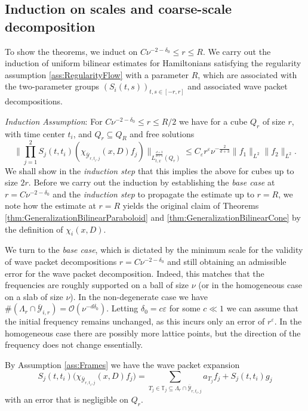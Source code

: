 \documentclass{amsart}
\theoremstyle{definition}
\newcommand{\T}{\mathbb{T}}
\begin{document}
\subsection{Induction on scales and coarse-scale decomposition}
\label{subsection:Induction}
To show the theorems, we induct on $C \nu^{-2-\delta_0} \leq r \leq R$. We carry out the induction of uniform bilinear estimates for Hamiltonians satisfying the regularity assumption \ref{ass:RegularityFlow} with a parameter $R$, which are associated with the two-parameter groups $(S_i(t,s))_{t,s \in [-r,r]}$ and associated wave packet decompositions. 

\emph{Induction Assumption}: For $C \nu^{-2-\delta_0} \leq r \leq R/2$ 
we have for a cube $Q_r$ of size $r$, with time center $t_i$, and $Q_r \subseteq Q_R$ and free solutions 
\begin{equation}
\label{eq:InductionHypothesis}
\| \prod_{j=1}^2 S_j(t,t_i) (\chi_{\overline{\mathcal{Y}}_{r,t_i,j}}(x,D) f_j) \|_{L^{\frac{d+3}{d+1}}_{t,x}(Q_r)} \leq C_\varepsilon r^{\varepsilon} \nu^{-\frac{2}{d+3}} \| f_1 \|_{L^2} \| f_2 \|_{L^2}.
\end{equation}
We shall show in the \emph{induction step} that this implies the above for cubes up to size $2r$. Before we carry out the induction by establishing the \emph{base case} at $r = C \nu^{-2-\delta_0}$ and the \emph{induction step} to propagate the estimate up to $r=R$, we note how the estimate at $r=R$ yields the original claim of Theorems \ref{thm:GeneralizationBilinearParaboloid} and \ref{thm:GeneralizationBilinearCone} by the definition of $\chi_i(x,D)$. 

\smallskip

We turn to the \emph{base case}, which is dictated by the minimum scale for the validity of wave packet decompositions $r = C \nu^{-2-\delta_0}$ and still obtaining an admissible error for the wave packet decomposition.
Indeed, this matches that the frequencies are roughly supported on a ball of size $\nu$ (or in the homogeneous case on a slab of size $\nu$). In the non-degenerate case we have $\# (\Lambda_r \cap \overline{\mathcal{Y}}_{i,r}) = \mathcal{O}(\nu^{-d \delta_0})$. Letting $\delta_0 = c \varepsilon$ for some $c \ll 1$ we can assume that the initial frequency remains unchanged, as this incurs only an error of $r^{\varepsilon}$. In the homogeneous case there are possibly more lattice points, but the direction of the frequency does not change essentially. 

By Assumption \ref{ass:Frames} we have the wave packet expansion
\begin{equation*}
S_j(t,t_i) \big( \chi_{\overline{\mathcal{Y}}_{r,t_i,j}}(x,D) f_j \big) = \sum_{T_j \in \T_j \subseteq \Lambda_r \cap \overline{\mathcal{Y}}_{r,t_i,j}} a_{T_j} f_j + S_j(t,t_i) g_j
\end{equation*}
with an error that is negligible on $Q_r$.
\end{document}
